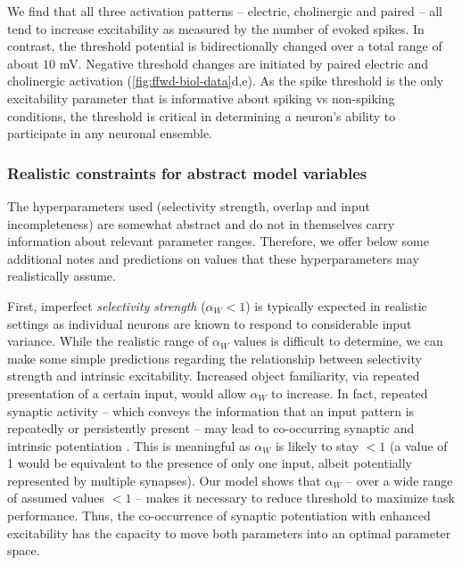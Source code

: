 We find that all three activation patterns
        -- electric, cholinergic and paired --
        all tend to increase excitability as measured by the number of evoked spikes.
    In contrast, the threshold potential is bidirectionally changed over a total range of about $10$ mV.
    Negative threshold changes are
         initiated
        by paired electric and cholinergic activation (\autoref{fig:ffwd-biol-data}d,e).
    As the spike threshold is the only excitability parameter
        that is informative about spiking vs non-spiking conditions,
        the threshold is critical in determining a neuron's ability to participate in any neuronal ensemble.


\subsubsection*{Realistic constraints for abstract model variables}

The hyperparameters used
        (selectivity strength, overlap and input incompleteness)
        are somewhat abstract
        and do not in themselves carry information about relevant parameter ranges.
    Therefore, we offer below some additional notes
        and predictions on values that these hyperparameters may realistically assume.

First, imperfect \textit{selectivity strength} ($\alpha_W < 1$)
        is typically expected in realistic settings
        as individual neurons are known to respond to considerable input variance.
    While the realistic range of $\alpha_W$ values is difficult to determine,
        we can make some simple predictions regarding the relationship between
            selectivity strength and intrinsic excitability.
    Increased object familiarity,
        via repeated presentation of a certain input,
        would allow $\alpha_W$ to increase.
    In fact, repeated synaptic activity
        -- which conveys the information that an input pattern is repeatedly or persistently present --
        may lead to co-occurring synaptic and intrinsic potentiation \citep[e.g.][]{Belmeguenai2010-ee}.
    This is meaningful as $\alpha_W$ is likely to stay $ < 1$
        (a value of 1 would be equivalent to the presence of only one input,
        albeit potentially represented by multiple synapses).
    Our model shows that $\alpha_W$ -- over a wide range of assumed values $ < 1$ --
        makes it necessary to reduce threshold to maximize task performance.
    Thus, the co-occurrence of synaptic potentiation with enhanced excitability has the capacity
        to move both parameters into an optimal parameter space.


